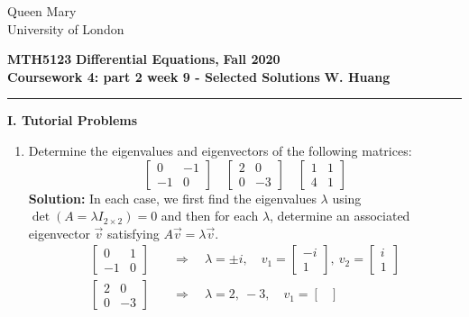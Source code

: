 \documentclass[11pt,a4paper,twoside]{article}
\begin{document}
	\begin{singlespace}
		\begin{center}
			\Huge Queen Mary\\
			\LARGE University of London
		\end{center}
		\Large \textbf{MTH5123} \hfill \Large \textbf{Differential Equations,} \hfill \Large \textbf{Fall 2020}\\
		\large \textbf{Coursework 4: part 2 week 9 - Selected Solutions} \hfill \large \textbf{W. Huang}
		\rule{\textwidth}{0.4pt}
	\end{singlespace}
	\textbf{I. Tutorial Problems}\par
	\begin{enumerate}[\bfseries A.]
		\item Determine the eigenvalues and eigenvectors of the following matrices:
		$$
		\begin{bmatrix}
			0 & -1\\
			-1 & 0
		\end{bmatrix}\quad
		\begin{bmatrix}
			2 & 0\\
			0 & -3
		\end{bmatrix}\quad
		\begin{bmatrix}
			1 & 1\\
			4 & 1
		\end{bmatrix}
		$$
		\textbf{Solution:} In each case, we first find the eigenvalues $\lambda$ using $\det(A = \lambda I_{2\times 2}) = 0$ and then for each $\lambda$, determine an associated eigenvector $\vec{v}$ satisfying $A\vec{v} = \lambda \vec{v}$.
		\begin{align*}
			\begin{bmatrix}
				0 & 1\\
				-1 & 0
			\end{bmatrix}\quad
			&\Rightarrow \quad
			\lambda = \pm i,\quad v_1 =
			\begin{bmatrix}
				-i\\
				1
			\end{bmatrix},\ v_2 = 
			\begin{bmatrix}
				i\\1
			\end{bmatrix}\\
			\begin{bmatrix}
				2 & 0\\
				0 & -3
			\end{bmatrix}\quad
			&\Rightarrow \quad
			\lambda = 2,\ -3,\quad v_1 =
			\begin{bmatrix}

\end{bmatrix}
\end{align*}
\end{enumerate}
\end{document}
